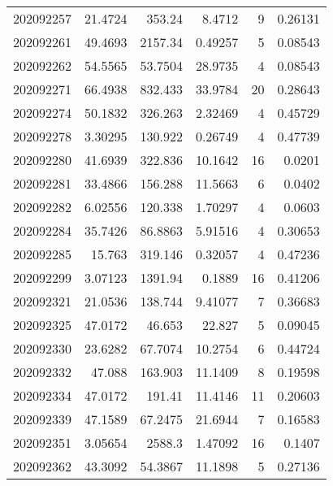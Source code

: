 \begin{tabular}{rrrrrr}
 202092257 &         21.4724  &      353.24   &            8.4712  &           9 & 0.26131 \\
 202092261 &         49.4693  &     2157.34   &            0.49257 &           5 & 0.08543 \\
 202092262 &         54.5565  &       53.7504 &           28.9735  &           4 & 0.08543 \\
 202092271 &         66.4938  &      832.433  &           33.9784  &          20 & 0.28643 \\
 202092274 &         50.1832  &      326.263  &            2.32469 &           4 & 0.45729 \\
 202092278 &          3.30295 &      130.922  &            0.26749 &           4 & 0.47739 \\
 202092280 &         41.6939  &      322.836  &           10.1642  &          16 & 0.0201  \\
 202092281 &         33.4866  &      156.288  &           11.5663  &           6 & 0.0402  \\
 202092282 &          6.02556 &      120.338  &            1.70297 &           4 & 0.0603  \\
 202092284 &         35.7426  &       86.8863 &            5.91516 &           4 & 0.30653 \\
 202092285 &         15.763   &      319.146  &            0.32057 &           4 & 0.47236 \\
 202092299 &          3.07123 &     1391.94   &            0.1889  &          16 & 0.41206 \\
 202092321 &         21.0536  &      138.744  &            9.41077 &           7 & 0.36683 \\
 202092325 &         47.0172  &       46.653  &           22.827   &           5 & 0.09045 \\
 202092330 &         23.6282  &       67.7074 &           10.2754  &           6 & 0.44724 \\
 202092332 &         47.088   &      163.903  &           11.1409  &           8 & 0.19598 \\
 202092334 &         47.0172  &      191.41   &           11.4146  &          11 & 0.20603 \\
 202092339 &         47.1589  &       67.2475 &           21.6944  &           7 & 0.16583 \\
 202092351 &          3.05654 &     2588.3    &            1.47092 &          16 & 0.1407  \\
 202092362 &         43.3092  &       54.3867 &           11.1898  &           5 & 0.27136 \\

\end{tabular}
